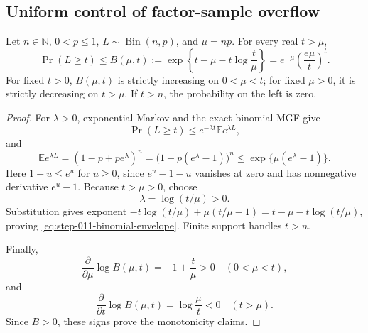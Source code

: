 \subsection{Uniform control of factor-sample overflow}
\label{app:step-011}

\begin{lemma}
\label{lem:step-011-binomial-envelope}
Let \(n\in\mathbb N\), \(0<p\le1\),
\(L\sim\operatorname{Bin}(n,p)\), and \(\mu=np\).  For every real
\(t>\mu\),
\begin{equation}\label{eq:step-011-binomial-envelope}
\Pr(L\ge t)
\le B(\mu,t)
:=\exp\!\left\{t-\mu-t\log\frac{t}{\mu}\right\}
=e^{-\mu}\left(\frac{e\mu}{t}\right)^t.
\end{equation}
For fixed \(t>0\), \(B(\mu,t)\) is strictly increasing on
\(0<\mu<t\); for fixed \(\mu>0\), it is strictly decreasing on
\(t>\mu\).  If \(t>n\), the probability on the left is zero.
\end{lemma}

\begin{proof}
For \(\lambda>0\), exponential Markov and the exact binomial MGF give
\begin{equation}\label{eq:step-011-exponential-markov}
\Pr(L\ge t)
\le e^{-\lambda t}\mathbb Ee^{\lambda L},
\end{equation}
and
\begin{equation}\label{eq:step-011-binomial-mgf}
\mathbb Ee^{\lambda L}
=(1-p+pe^\lambda)^n
=\bigl(1+p(e^\lambda-1)\bigr)^n
\le\exp\{\mu(e^\lambda-1)\}.
\end{equation}
Here \(1+u\le e^u\) for \(u\ge0\), since
\(e^u-1-u\) vanishes at zero and has nonnegative derivative
\(e^u-1\).  Because \(t>\mu>0\), choose
\begin{equation}\label{eq:step-011-optimal-lambda}
\lambda=\log(t/\mu)>0.
\end{equation}
Substitution gives exponent
\(-t\log(t/\mu)+\mu(t/\mu-1)=t-\mu-t\log(t/\mu)\), proving
\eqref{eq:step-011-binomial-envelope}.  Finite support handles \(t>n\).

Finally,
\begin{equation}\label{eq:step-011-mu-derivative}
\frac{\partial}{\partial\mu}\log B(\mu,t)
=-1+\frac t\mu>0
\quad(0<\mu<t),
\end{equation}
and
\begin{equation}\label{eq:step-011-t-derivative}
\frac{\partial}{\partial t}\log B(\mu,t)
=\log\frac\mu t<0
\quad(t>\mu).
\end{equation}
Since \(B>0\), these signs prove the monotonicity claims.
\end{proof}

